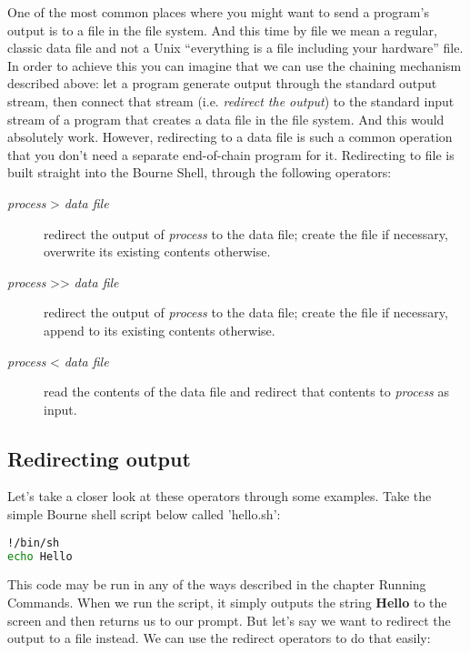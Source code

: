 One of the most common places where you might want to send a program's output
is to a file in the file system. And this time by file we mean a regular,
classic data file and not a Unix ``everything is a file including your
hardware'' file. In order to achieve this you can imagine that we can use the
chaining mechanism described above: let a program generate output through the
standard output stream, then connect that stream (i.e. \emph{redirect the
output}) to the standard input stream of a program that creates a data file in
the file system. And this would absolutely work. However, redirecting to a data
file is such a common operation that you don't need a separate end-of-chain
program for it. Redirecting to file is built straight into the Bourne Shell,
through the following operators:
\begin{description}
	\item[\emph{process} \textgreater{} \emph{data file}] redirect the output
of \emph{process} to the data file; create the file if necessary, overwrite its
existing contents otherwise.
	\item[\emph{process} \textgreater{}\textgreater{} \emph{data file}]
redirect the output of \emph{process} to the data file; create the file if
necessary, append to its existing contents otherwise.
	\item[\emph{process} \textless{} \emph{data file}] read the contents of the
data file and redirect that contents to \emph{process} as input.
\end{description}

\subsection{Redirecting output}
Let's take a closer look at these operators through some examples. Take the
simple Bourne shell script below called 'hello.sh':
\lstset{basicstyle=\scriptsize, numbers=left, captionpos=b, tabsize=4}
\begin{lstlisting}[caption=A simple shell script that generates some output,language={bash},
breaklines=true,xleftmargin=15pt,label=lst:A simple shell script that generates some output]
!/bin/sh
echo Hello
\end{lstlisting}

This code may be run in any of the ways described in the chapter Running
Commands. When we run the script, it simply outputs the string \textbf{Hello}
to the screen and then returns us to our prompt. But let's say we want to
redirect the output to a file instead. We can use the redirect operators to do
that easily:

